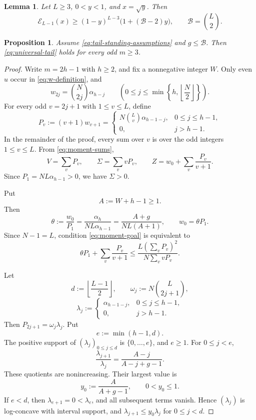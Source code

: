 \documentclass[10pt,a4paper]{amsart}
\newtheorem{proposition}{Proposition}
\newtheorem{lemma}{Lemma}
\newcommand{\Bc}{\mathcal{B}}
\begin{document}
\begin{lemma}\label{lem:E-lower-bound}
Let \(L\ge3\), \(0<y<1\), and \(x=\sqrt y\).  Then
\begin{equation}\label{eq:E-lower-bound}
 \mathcal E_{L-1}(x)
 \ge
 (1-y)^{L-3}\bigl(1+(\Bc-2)y\bigr),
 \qquad
 \Bc=\binom L2.
\end{equation}
\end{lemma}

\begin{proposition}\label{prop:odd-centres}
Assume \eqref{eq:tail-standing-assumptions} and \(g\le\Bc\).  Then
\eqref{eq:universal-tail} holds for every odd \(m\ge3\).
\end{proposition}

\begin{proof}
Write \(m=2h-1\) with \(h\ge2\), and fix a nonnegative integer \(W\).
Only even \(u\)
occur in \eqref{eq:w-definition}, and
\[
 w_{2j}=\binom N{2j}\alpha_{h-j}
 \qquad
 \left(0\le j\le\min\left\{h,\left\lfloor\frac N2\right\rfloor\right\}\right).
\]
For every odd \(v=2j+1\) with \(1\le v\le L\), define
\[
 P_v:=(v+1)w_{v+1}
 =
 \begin{cases}
  \displaystyle
  N\binom Lv\alpha_{h-1-j},&0\le j\le h-1,\\[5pt]
  0,&j>h-1.
 \end{cases}
\]
In the remainder of the proof, every sum over \(v\) is over the odd
integers \(1\le v\le L\).  From \eqref{eq:moment-sums},
\begin{equation}\label{eq:odd-dictionary}
 V=\sum_vP_v,\qquad
 \Sigma=\sum_vvP_v,\qquad
 Z=w_0+\sum_v\frac{P_v}{v+1}.
\end{equation}
Since \(P_1=NL\alpha_{h-1}>0\), we have \(\Sigma>0\).

Put
\[
 A:=W+h-1\ge1.
\]
Then
\begin{equation}\label{eq:theta-definition}
 \theta:=\frac{w_0}{P_1}
 =\frac{\alpha_h}{NL\alpha_{h-1}}
 =\frac{A+g}{NL(A+1)},
 \qquad
 w_0=\theta P_1.
\end{equation}
Since \(N-1=L\), condition \eqref{eq:moment-goal} is equivalent to
\begin{equation}\label{eq:odd-goal}
 \theta P_1+\sum_v\frac{P_v}{v+1}
 \le
 \frac{L\left(\sum_vP_v\right)^2}
 {N\sum_vvP_v}.
\end{equation}

Let
\[
 d:=\left\lfloor\frac{L-1}{2}\right\rfloor,
 \qquad
 \omega_j:=N\binom L{2j+1},
\]
\[
 \lambda_j:=
 \begin{cases}
  \alpha_{h-1-j},&0\le j\le h-1,\\
  0,&j>h-1.
 \end{cases}
\]
Then \(P_{2j+1}=\omega_j\lambda_j\).  Put
\[
 e:=\min(h-1,d).
\]
The positive support of \((\lambda_j)_{0\le j\le d}\) is
\(\{0,\ldots,e\}\), and \(e\ge1\).  For \(0\le j<e\),
\[
 \frac{\lambda_{j+1}}{\lambda_j}
 =
 \frac{A-j}{A-j+g-1}.
\]
These quotients are nonincreasing.  Their largest value is
\[
 y_0:=\frac{A}{A+g-1},
 \qquad
 0<y_0\le1.
\]
If \(e<d\), then \(\lambda_{e+1}=0<\lambda_e\), and all subsequent
terms vanish.  Hence \((\lambda_j)\) is log-concave with interval support,
and
\(\lambda_{j+1}\le y_0\lambda_j\) for \(0\le j<d\).


\end{proof}
\end{document}
